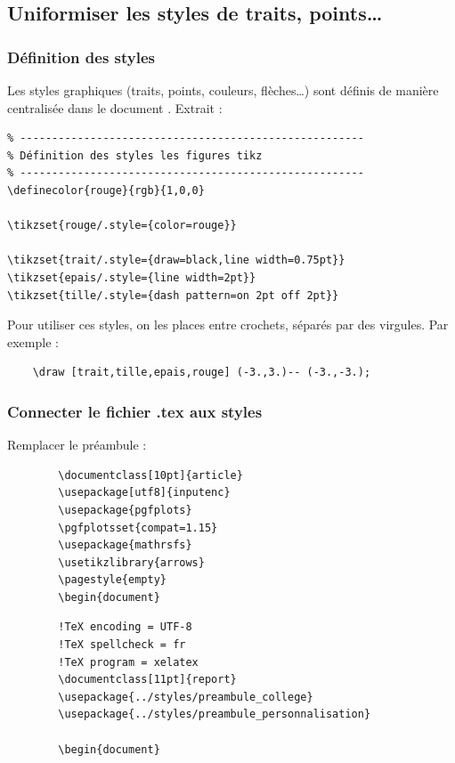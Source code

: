 \documentclass[10pt,a4paper]{report}
\begin{document}
\subsection{Uniformiser les styles de traits, points\dots}


\subsubsection{Définition des styles}

Les styles graphiques (traits, points, couleurs, flèches\dots) sont définis de manière centralisée dans le document . Extrait :

\begin{verbatim}
% ------------------------------------------------------
% Définition des styles les figures tikz
% ------------------------------------------------------
\definecolor{rouge}{rgb}{1,0,0}

\tikzset{rouge/.style={color=rouge}}

\tikzset{trait/.style={draw=black,line width=0.75pt}}
\tikzset{epais/.style={line width=2pt}}
\tikzset{tille/.style={dash pattern=on 2pt off 2pt}}
\end{verbatim}

Pour utiliser ces styles, on les places entre crochets, séparés par des virgules. Par exemple : 

\begin{verbatim}
	\draw [trait,tille,epais,rouge] (-3.,3.)-- (-3.,-3.);
\end{verbatim}



\subsubsection{Connecter le fichier .tex aux styles}

Remplacer le préambule : \\

\begin{minipage}{.35\linewidth}
	\begin{verbatim}
		\documentclass[10pt]{article}
		\usepackage[utf8]{inputenc}
		\usepackage{pgfplots}
		\pgfplotsset{compat=1.15}
		\usepackage{mathrsfs}
		\usetikzlibrary{arrows}
		\pagestyle{empty}
		\begin{document}
	\end{verbatim}
\end{minipage}
{\huge\textrightarrow \quad}
\begin{minipage}{.4\linewidth}
	\begin{verbatim}
		!TeX encoding = UTF-8
		!TeX spellcheck = fr
		!TeX program = xelatex
		\documentclass[11pt]{report}
		\usepackage{../styles/preambule_college}
		\usepackage{../styles/preambule_personnalisation}
		
		\begin{document}
	\end{verbatim}
\end{minipage}
\end{document}
